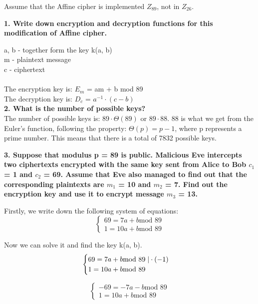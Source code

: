 \documentclass[12pt]{article}
\begin{document}
Assume that the Affine cipher is implemented $Z_{89}$, not in $Z_{26}$.
\newline

\noindent
\textbf{1. Write down encryption and decryption functions for this modification of Affine cipher.}\newline

\noindent a, b - together form the key k(a, b) \\
m - plaintext message \\
c - ciphertext \\\\
\noindent The encryption key is: $E_m$ = am + b mod 89 \\
The decryption key is: $D_c$ = $a^{-1} \cdot (c - b)$ \\

\noindent \textbf{2. What is the number of possible keys?}
\newline
\noindent
\\The number of possible keys is: $89 \cdot \Theta(89)$ or $89 \cdot 88$. 88 is 
what we get from the Euler's function, following the property: $\Theta(p) = p - 1$, 
where p represents a prime number. This means that there is a total of 7832 possible
keys.
\newline

\noindent \textbf{3. Suppose that modulus p = 89 is public. Malicious Eve intercepts 
two ciphertexts encrypted with the same key sent from Alice to Bob $c_1$ = 1 and
$c_2$ = 69. Assume that Eve also managed to find out that the corresponding 
plaintexts are $m_1$ = 10 and $m_2$ = 7. Find out the encryption key and use it 
to encrypt message $m_3$ = 13.}
\newline

\noindent Firstly, we write down the following system of equations:
$$\begin{cases}
    69 = 7a + b \text{mod 89} \\
    1 = 10a + b \text{mod 89} 
\end{cases}$$

Now we can solve it and find the key k(a, b). 
$$\begin{cases}
    69 = 7a + b \text{mod 89} \hspace{0.1cm} | \cdot (-1) \\
    1 = 10a + b \text{mod 89} 
\end{cases}$$

$$\begin{cases}
    -69 = -7a - b \text{mod 89} \\
    1 = 10a + b \text{mod 89} 
\end{cases}$$
\end{document}
